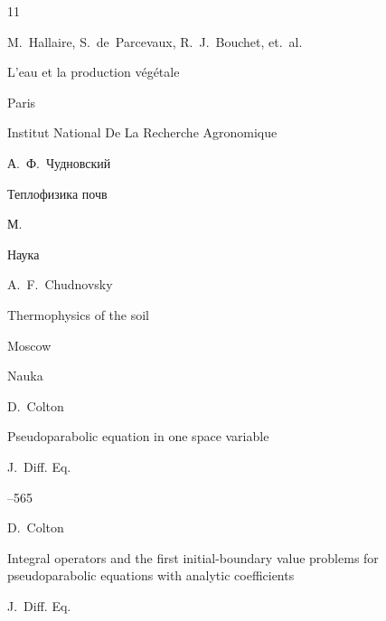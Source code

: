 {\begin{thebibliography}{11}

\by M.~Hallaire,  S.~de~Parcevaux, R.~J.~Bouchet, et.~al.

\book L'eau et la production v\'eg\'etale

\publaddr Paris 


\publ Institut National De La Recherche Agronomique








\by А.~Ф.~Чудновский

\book Теплофизика почв 

\publaddr М. 

\publ Наука 



\misctransl

\by A.~F.~Chudnovsky 


\book Thermophysics of the soil 

\publaddr Moscow

\publ Nauka








\by D.~Colton

\paper Pseudoparabolic equation in one space variable

\jour J.~Diff. Eq.




--565






\by D.~Colton

\paper Integral operators and the first initial-boundary value problems for pseudoparabolic equations with analytic coefficients

\jour J.~Diff. Eq.



\end{thebibliography}}
